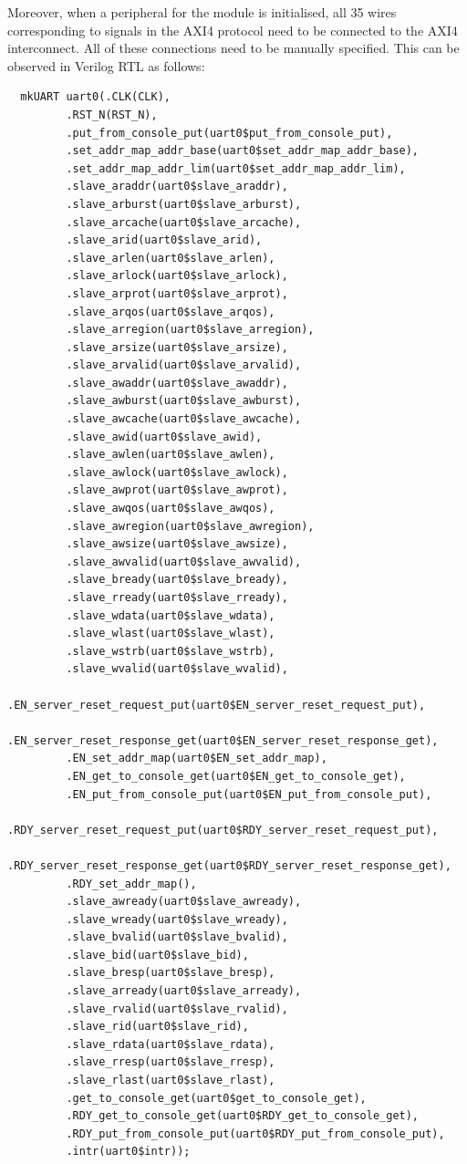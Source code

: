 \documentclass[a4paper,8pt]{report}
\begin{document}
Moreover, when a peripheral for the module is initialised, all 35 wires
corresponding to signals in the AXI4 protocol need to be connected to the AXI4
interconnect. All of these connections need to be manually specified. This can
be observed in Verilog RTL as follows:
\tiny
\begin{verbatim}
  mkUART uart0(.CLK(CLK),
         .RST_N(RST_N),
         .put_from_console_put(uart0$put_from_console_put),
         .set_addr_map_addr_base(uart0$set_addr_map_addr_base),
         .set_addr_map_addr_lim(uart0$set_addr_map_addr_lim),
         .slave_araddr(uart0$slave_araddr),
         .slave_arburst(uart0$slave_arburst),
         .slave_arcache(uart0$slave_arcache),
         .slave_arid(uart0$slave_arid),
         .slave_arlen(uart0$slave_arlen),
         .slave_arlock(uart0$slave_arlock),
         .slave_arprot(uart0$slave_arprot),
         .slave_arqos(uart0$slave_arqos),
         .slave_arregion(uart0$slave_arregion),
         .slave_arsize(uart0$slave_arsize),
         .slave_arvalid(uart0$slave_arvalid),
         .slave_awaddr(uart0$slave_awaddr),
         .slave_awburst(uart0$slave_awburst),
         .slave_awcache(uart0$slave_awcache),
         .slave_awid(uart0$slave_awid),
         .slave_awlen(uart0$slave_awlen),
         .slave_awlock(uart0$slave_awlock),
         .slave_awprot(uart0$slave_awprot),
         .slave_awqos(uart0$slave_awqos),
         .slave_awregion(uart0$slave_awregion),
         .slave_awsize(uart0$slave_awsize),
         .slave_awvalid(uart0$slave_awvalid),
         .slave_bready(uart0$slave_bready),
         .slave_rready(uart0$slave_rready),
         .slave_wdata(uart0$slave_wdata),
         .slave_wlast(uart0$slave_wlast),
         .slave_wstrb(uart0$slave_wstrb),
         .slave_wvalid(uart0$slave_wvalid),
         .EN_server_reset_request_put(uart0$EN_server_reset_request_put),
         .EN_server_reset_response_get(uart0$EN_server_reset_response_get),
         .EN_set_addr_map(uart0$EN_set_addr_map),
         .EN_get_to_console_get(uart0$EN_get_to_console_get),
         .EN_put_from_console_put(uart0$EN_put_from_console_put),
         .RDY_server_reset_request_put(uart0$RDY_server_reset_request_put),
         .RDY_server_reset_response_get(uart0$RDY_server_reset_response_get),
         .RDY_set_addr_map(),
         .slave_awready(uart0$slave_awready),
         .slave_wready(uart0$slave_wready),
         .slave_bvalid(uart0$slave_bvalid),
         .slave_bid(uart0$slave_bid),
         .slave_bresp(uart0$slave_bresp),
         .slave_arready(uart0$slave_arready),
         .slave_rvalid(uart0$slave_rvalid),
         .slave_rid(uart0$slave_rid),
         .slave_rdata(uart0$slave_rdata),
         .slave_rresp(uart0$slave_rresp),
         .slave_rlast(uart0$slave_rlast),
         .get_to_console_get(uart0$get_to_console_get),
         .RDY_get_to_console_get(uart0$RDY_get_to_console_get),
         .RDY_put_from_console_put(uart0$RDY_put_from_console_put),
         .intr(uart0$intr));
\end{verbatim}
\normalsize
\end{document}
